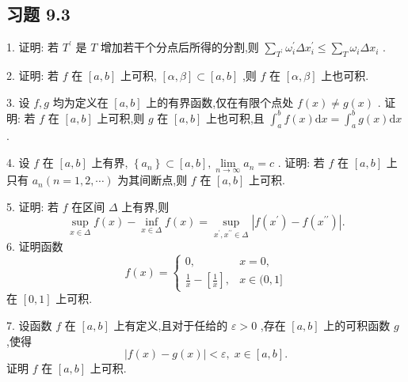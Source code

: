 \subsection{习题 9.3}

1. 证明: 若 \({T}^{\prime }\) 是 \(T\) 增加若干个分点后所得的分割,则 \(\mathop{\sum }\limits_{{T}^{\prime }}{\omega }_{i}^{\prime }\Delta {x}_{i}^{\prime } \leq  \mathop{\sum }\limits_{T}{\omega }_{i}\Delta {x}_{i}\) .

2. 证明: 若 \(f\) 在 \(\left\lbrack  {a,b}\right\rbrack\) 上可积, \(\left\lbrack  {\alpha ,\beta }\right\rbrack   \subset  \left\lbrack  {a,b}\right\rbrack\) ,则 \(f\) 在 \(\left\lbrack  {\alpha ,\beta }\right\rbrack\) 上也可积.

3. 设 \(f,g\) 均为定义在 \(\left\lbrack  {a,b}\right\rbrack\) 上的有界函数,仅在有限个点处 \(f\left( x\right)  \neq  g\left( x\right)\) . 证明: 若 \(f\) 在 \(\left\lbrack  {a,b}\right\rbrack\) 上可积,则 \(g\) 在 \(\left\lbrack  {a,b}\right\rbrack\) 上也可积,且 \({\int }_{a}^{b}f\left( x\right) \mathrm{d}x = {\int }_{a}^{b}g\left( x\right) \mathrm{d}x\) .

4. 设 \(f\) 在 \(\left\lbrack  {a,b}\right\rbrack\) 上有界, \(\left\{  {a}_{n}\right\}   \subset  \left\lbrack  {a,b}\right\rbrack  ,\mathop{\lim }\limits_{{n \rightarrow  \infty }}{a}_{n} = c\) . 证明: 若 \(f\) 在 \(\left\lbrack  {a,b}\right\rbrack\) 上只有 \({a}_{n}\left( {n = 1,2,\cdots }\right)\) 为其间断点,则 \(f\) 在 \(\left\lbrack  {a,b}\right\rbrack\) 上可积.

5. 证明: 若 \(f\) 在区间 \(\Delta\) 上有界,则
\[
\mathop{\sup }\limits_{{x \in  \Delta }}f\left( x\right)  - \mathop{\inf }\limits_{{x \in  \Delta }}f\left( x\right)  = \mathop{\sup }\limits_{{{x}^{\prime },{x}^{\prime \prime } \in  \Delta }}\left| {f\left( {x}^{\prime }\right)  - f\left( {x}^{\prime \prime }\right) }\right| .
\]
6. 证明函数
\[
f\left( x\right)  = \left\{  \begin{array}{ll} 0, & x = 0, \\  \frac{1}{x} - \left\lbrack  \frac{1}{x}\right\rbrack  , & x \in  (0,1\rbrack  \end{array}\right.
\]
在 \(\left\lbrack  {0,1}\right\rbrack\) 上可积.

7. 设函数 \(f\) 在 \(\left\lbrack  {a,b}\right\rbrack\) 上有定义,且对于任给的 \(\varepsilon  > 0\) ,存在 \(\left\lbrack  {a,b}\right\rbrack\) 上的可积函数 \(g\) ,使得
\[
\left| {f\left( x\right)  - g\left( x\right) }\right|  < \varepsilon ,\;x \in  \left\lbrack  {a,b}\right\rbrack  .
\]
证明 \(f\) 在 \(\left\lbrack  {a,b}\right\rbrack\) 上可积.

